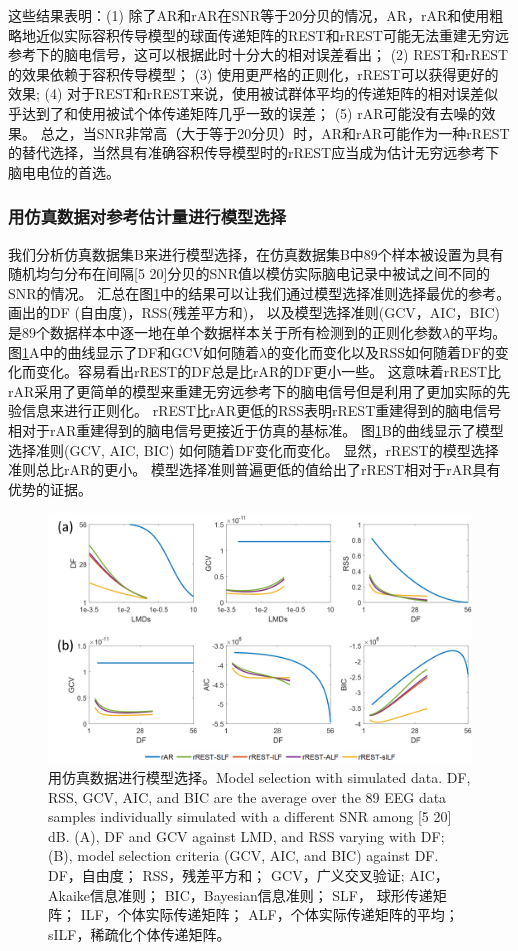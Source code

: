 这些结果表明：(1) 除了AR和rAR在SNR等于20分贝的情况，AR，rAR和使用粗略地近似实际容积传导模型的球面传递矩阵的REST和rREST可能无法重建无穷远参考下的脑电信号，这可以根据此时十分大的相对误差看出； (2) REST和rREST的效果依赖于容积传导模型； (3) 使用更严格的正则化，rREST可以获得更好的效果; (4) 对于REST和rREST来说，使用被试群体平均的传递矩阵的相对误差似乎达到了和使用被试个体传递矩阵几乎一致的误差； (5) rAR可能没有去噪的效果。 总之，当SNR非常高（大于等于20分贝）时，AR和rAR可能作为一种rREST的替代选择，当然具有准确容积传导模型时的rREST应当成为估计无穷远参考下脑电电位的首选。

\subsubsection{用仿真数据对参考估计量进行模型选择}
我们分析仿真数据集B来进行模型选择，在仿真数据集B中89个样本被设置为具有随机均匀分布在间隔[5 20]分贝的SNR值以模仿实际脑电记录中被试之间不同的SNR的情况。 汇总在图\ref{3.5}中的结果可以让我们通过模型选择准则选择最优的参考。 画出的DF (自由度)，RSS(残差平方和)， 以及模型选择准则(GCV，AIC，BIC) 是89个数据样本中逐一地在单个数据样本关于所有检测到的正则化参数$\lambda$的平均。
图\ref{3.5}A中的曲线显示了DF和GCV如何随着$\lambda$的变化而变化以及RSS如何随着DF的变化而变化。容易看出rREST的DF总是比rAR的DF更小一些。 这意味着rREST比rAR采用了更简单的模型来重建无穷远参考下的脑电信号但是利用了更加实际的先验信息来进行正则化。 rREST比rAR更低的RSS表明rREST重建得到的脑电信号相对于rAR重建得到的脑电信号更接近于仿真的基标准。 图\ref{3.5}B的曲线显示了模型选择准则(GCV, AIC, BIC) 如何随着DF变化而变化。 显然，rREST的模型选择准则总比rAR的更小。 模型选择准则普遍更低的值给出了rREST相对于rAR具有优势的证据。
\begin{figure}[!ht]
	\centering
	\includegraphics[width=15cm]{pic/Frontier/figure5.png}
	\caption{用仿真数据进行模型选择。Model selection with simulated data. DF, RSS, GCV, AIC, and BIC are the average over the 89 EEG data samples individually simulated with a different
		SNR among [5 20] dB. (A), DF and GCV against LMD, and RSS varying with DF; (B), model selection criteria (GCV, AIC, and BIC) against DF. DF，自由度；
		RSS，残差平方和； GCV，广义交叉验证; AIC，Akaike信息准则； BIC，Bayesian信息准则； SLF， 球形传递矩阵； ILF，个体实际传递矩阵； ALF，个体实际传递矩阵的平均； sILF，稀疏化个体传递矩阵。}
	\label{3.5}
\end{figure}


